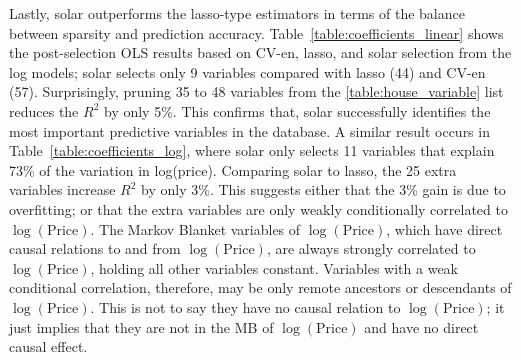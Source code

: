 \documentclass[11pt,review,authoryear]{elsarticle}
\begin{document}
Lastly, solar outperforms the lasso-type estimators in terms of the balance between sparsity and prediction accuracy. Table~\ref{table:coefficients_linear} shows the post-selection OLS results based on CV-en, lasso, and solar selection from the log models; solar selects only 9 variables compared with lasso (44) and CV-en (57). Surprisingly, pruning 35 to 48 variables from the \ref{table:house_variable} list reduces the $R^2$ by only 5\%. This confirms that, solar successfully identifies the most important predictive variables in the database. A similar result occurs in Table~\ref{table:coefficients_log}, where solar only selects 11  variables that explain 73\% of the variation in log(price). Comparing solar to lasso, the 25 extra variables increase $R^2$ by only 3\%. This suggests either that the 3\% gain is due to overfitting; or that the extra variables are only weakly conditionally correlated to $\log \left( \mathrm{Price} \right)$. The Markov Blanket variables of $\log \left( \mathrm{Price} \right)$, which have direct causal relations to and from $\log \left( \mathrm{Price} \right)$, are always strongly correlated to $\log \left( \mathrm{Price} \right)$, holding all other variables constant. Variables with a weak conditional correlation, therefore, may be only remote ancestors or descendants of $\log \left( \mathrm{Price} \right)$. This is not to say they have no causal relation to $\log \left( \mathrm{Price} \right)$; it just implies that they are not in the MB of $\log \left( \mathrm{Price} \right)$ and have no direct causal effect.
\end{document}
